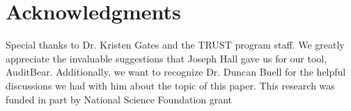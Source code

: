 \section{Acknowledgments}
Special thanks to Dr. Kristen Gates and the TRUST
program staff.  We greatly appreciate the invaluable suggestions that Joseph
Hall gave us for our tool, AuditBear.  Additionally, we want to recognize
Dr. Duncan Buell for the helpful discussions we had with him about the topic of
this paper. This research was funded in part by National Science Foundation
grant 
